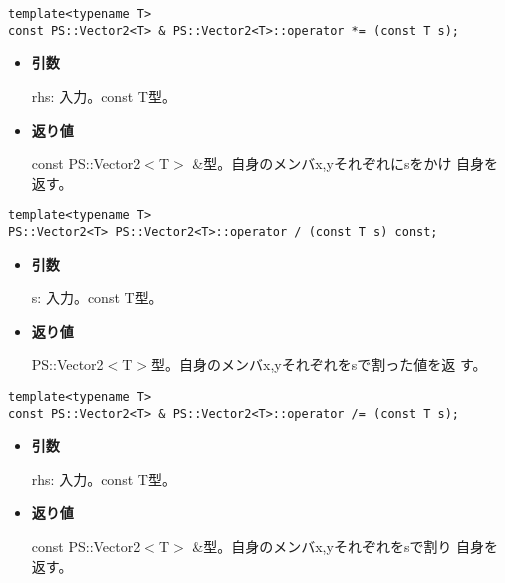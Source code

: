 \begin{screen}
\begin{verbatim}
template<typename T>
const PS::Vector2<T> & PS::Vector2<T>::operator *= (const T s);
\end{verbatim}
\end{screen}

\begin{itemize}

\item{{\bf 引数}}

{rhs}: 入力。{const T}型。

\item{{\bf 返り値}}

{const PS::Vector2$<$T$>$ \&}型。自身のメンバx,yそれぞれに{s}をかけ
自身を返す。

\end{itemize}

\begin{screen}
\begin{verbatim}
template<typename T>
PS::Vector2<T> PS::Vector2<T>::operator / (const T s) const;
\end{verbatim}
\end{screen}

\begin{itemize}

\item{{\bf 引数}}

{s}: 入力。{const T}型。

\item{{\bf 返り値}}

{PS::Vector2$<$T$>$}型。自身のメンバx,yそれぞれを{s}で割った値を返
す。

\end{itemize}

\begin{screen}
\begin{verbatim}
template<typename T>
const PS::Vector2<T> & PS::Vector2<T>::operator /= (const T s);
\end{verbatim}
\end{screen}

\begin{itemize}

\item{{\bf 引数}}

{rhs}: 入力。{const T}型。

\item{{\bf 返り値}}

{const PS::Vector2$<$T$>$ \&}型。自身のメンバx,yそれぞれを{s}で割り
自身を返す。

\end{itemize}

